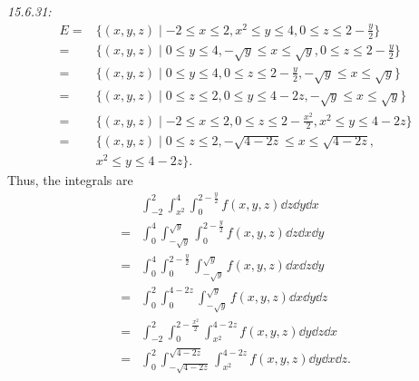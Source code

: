 \documentclass[8pt,twocolumn]{article}
\begin{document}
\begin{Answer}[number=20]
  \emph{15.6.31:}
  \begin{align*}
    E =&  \{ (x,y,z) \mid -2 \le x \le 2, x^2 \le y \le 4,  0 \le z \le 2-\frac{y}{2} \} \\
    = &\{ (x,y,z) \mid 0 \le y \le 4, -\sqrt{y} \le x\le \sqrt{y}, 0 \le z \le 2-\frac{y}{2} \} \\
    = &\{ (x,y,z) \mid 0 \le y \le 4, 0 \le z \le 2-\frac{y}{2}, -\sqrt{y} \le x\le \sqrt{y} \} \\
    = &\{ (x,y,z) \mid 0 \le z \le 2, 0 \le y \le 4-2z, -\sqrt{y} \le x\le \sqrt{y} \} \\
    = &\{ (x,y,z) \mid -2 \le x \le 2, 0 \le z \le 2-\frac{x^2}{2}, x^2 \le y \le 4-2z \} \\
    = &\{ (x,y,z) \mid 0 \le z \le 2, -\sqrt{4-2z} \le x\le \sqrt{4-2z},\\ &x^2 \le y \le
    4-2z \}.
  \end{align*}
  Thus, the integrals are
  \begin{align*}
    &\int_{-2}^2 \int_{x^2}^4
    \int_0^{2-\frac{y}{2}} f(x,y,z) \dd{z}\dd{y}\dd{x} \\
 = &\int_0^4\int_{-\sqrt{y}}^{\sqrt{y}} \int_0^{2-\frac{y}{2}} f(x,y,z)\dd{z}\dd{x}\dd{y} \\
 = &\int_0^4 \int_0^{2-\frac{y}{2}} \int_{-\sqrt{y}}^{\sqrt{y}}
    f(x,y,z)\dd{x}\dd{z}\dd{y} \\
 = &\int_0^2 \int_0^{4-2z} \int_{-\sqrt{y}}^{\sqrt{y}} f(x,y,z) \dd{x}\dd{y}\dd{z} \\
 = &\int_{-2}^2 \int_0^{2-\frac{x^2}{2}} \int_{x^2}^{4-2z} f(x,y,z) \dd{y}\dd{z}\dd{x} \\
 = &\int_0^2 \int_{-\sqrt{4-2z}}^{\sqrt{4-2z}} \int_{x^2}^{4-2z} f(x,y,z) \dd{y}\dd{x}\dd{z}.
  \end{align*}
\end{Answer}
\end{document}
